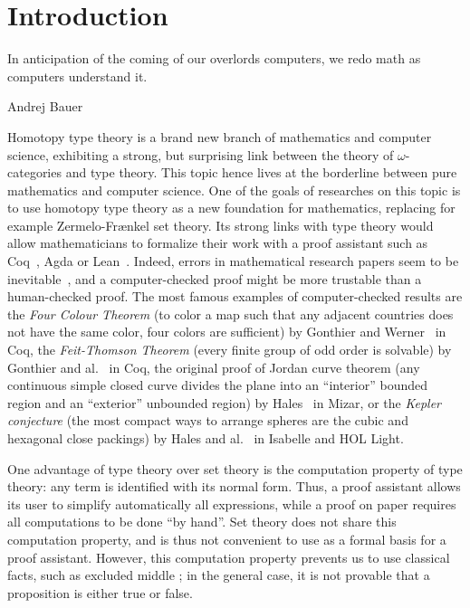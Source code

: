 \chapter{Introduction}
\label{chap:intro} \epigraph{In anticipation of the coming of our
overlords computers, we redo math as computers understand it.}{Andrej
Bauer}

Homotopy type theory is a brand new branch of mathematics and computer
science, exhibiting a strong, but surprising link between the theory
of $\omega$-categories and type theory. This topic hence lives at the
borderline between pure mathematics and computer science. One of the
goals of researches on this topic is to use homotopy type theory as a
new foundation for mathematics, replacing for example Zermelo-Frænkel
set theory. Its strong links with type theory would allow
mathematicians to formalize their work with a proof assistant such as
Coq~\cite{coq:refman:8.4}, Agda\cite{norell2007towards} or
Lean~\cite{lean}. Indeed, errors in mathematical research papers seem
to be inevitable~\cite{vv-univ-f}, and a computer-checked proof might
be more trustable than a human-checked proof.  The most famous
examples of computer-checked results are the {\em Four Colour Theorem}
(to color a map such that any adjacent countries does not have the
same color, four colors are sufficient) by Gonthier and
Werner~\cite{gonthier-four-color} in Coq, the {\em Feit-Thomson
Theorem} (every finite group of odd order is solvable) by Gonthier and
al.~\cite{gonthier-feit} in Coq, the original proof of Jordan curve
theorem (any continuous simple closed curve divides the plane into an
``interior'' bounded region and an ``exterior'' unbounded region) by
Hales~\cite{hales-jordan} in Mizar, or the {\em Kepler conjecture}
(the most compact ways to arrange spheres are the cubic and hexagonal
close packings) by Hales and al.~\cite{hales-kepler} in Isabelle and
HOL Light.

One advantage of type theory over set theory is the computation
property of type theory: any term is identified with its normal
form. Thus, a proof assistant allows its user to simplify
automatically all expressions, while a proof on paper requires all
computations to be done ``by hand''. Set theory does not share this
computation property, and is thus not convenient to use as a formal
basis for a proof assistant. However, this computation property
prevents us to use classical facts, such as excluded middle ; in the
general case, it is not provable that a proposition is either true or
false.

